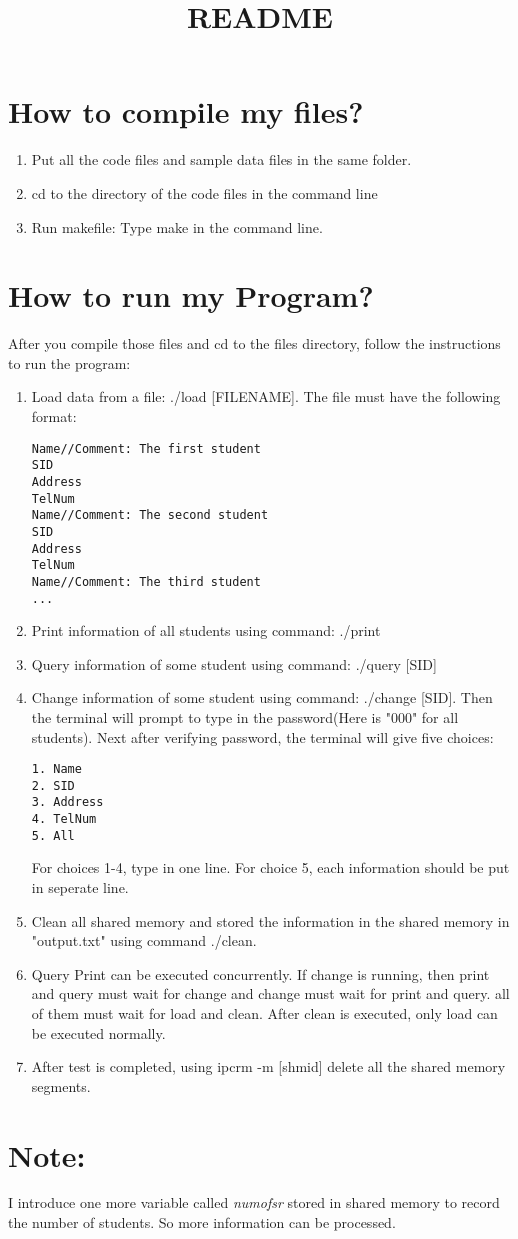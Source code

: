 \documentclass[12pt]{article}
\title{README}
\begin{document}
\section{How to compile my files?}
\begin{enumerate}
\item Put all the code files and sample data files in the same folder.
\item cd to the directory of the code files in the command line
\item Run makefile: Type make in the command line.

\end{enumerate}


\section{How to run my Program?}
After you compile those files and cd to the files directory, follow the instructions to run the program: 
\begin{enumerate}
\item Load data from a file: ./load [FILENAME].  The file must have the following format:

\begin{verbatim}
Name//Comment: The first student
SID
Address
TelNum
Name//Comment: The second student
SID
Address
TelNum
Name//Comment: The third student
...
\end{verbatim}

\item Print information of all students using command: ./print

\item Query information of some student using command: ./query [SID]

\item Change information of some student using command: ./change [SID]. Then the terminal will prompt to type in the password(Here is "000" for all students). Next after verifying password, the terminal will give five choices:
\begin{verbatim}
1. Name
2. SID
3. Address
4. TelNum
5. All
\end{verbatim}
For choices 1-4, type in one line. For choice 5, each information should be put in seperate line.

\item Clean all shared memory and stored the information in the shared memory in "output.txt" using command ./clean.

\item Query Print can be executed concurrently. If change is running, then print and query must wait for change and change must wait for print and query. all of them must wait for load and clean. After clean is executed, only load can be executed normally.

\item After test is completed, using ipcrm -m [shmid] delete all the shared memory segments. 
\end{enumerate}


\section*{Note:}
I introduce one more variable called \emph{numofsr} stored in shared memory to record the number of students. So more information can be processed.
\end{document}
